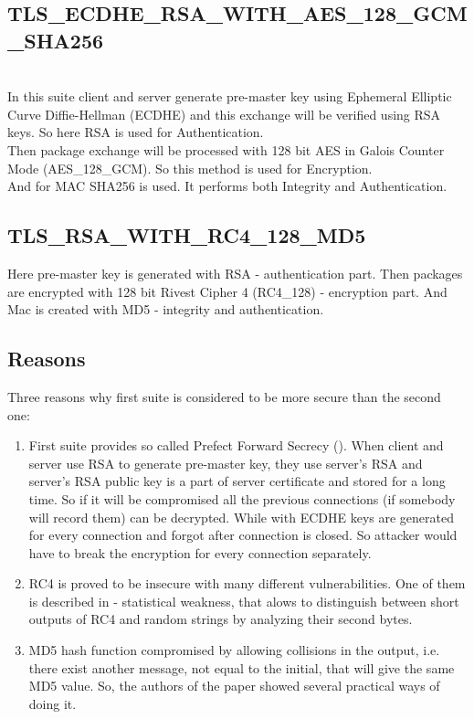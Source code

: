 \documentclass{article}
\begin{document}
\subsection*{TLS\_ECDHE\_RSA\_WITH\_AES\_128\_GCM\_SHA256}
\cite{tls-ref}
\\
In this suite client and server generate pre-master key using Ephemeral Elliptic Curve Diffie-Hellman (ECDHE) and this exchange will be verified using RSA keys. So here RSA is used for Authentication. 
\\
Then package exchange will be processed with 128 bit AES in Galois Counter Mode (AES\_128\_GCM). So this method is used for Encryption.
\\
And for MAC SHA256 is used. It performs both Integrity and Authentication.

\subsection*{TLS\_RSA\_WITH\_RC4\_128\_MD5}
Here pre-master key is generated with RSA - authentication part. Then packages are encrypted with 128 bit Rivest Cipher 4 (RC4\_128) - encryption part. And Mac is created with MD5 - integrity and authentication.

\subsection*{Reasons}
Three reasons why first suite is considered to be more secure than the second one:
\begin{enumerate}
\item First suite provides so called Prefect Forward Secrecy (\cite{pfc}). When client and server use RSA to generate pre-master key, they use server's RSA and server's RSA public key is a part of server certificate and stored for a long time. So if it will be compromised all the previous connections (if somebody will record them) can be decrypted. While with ECDHE keys are generated for every connection and forgot after connection is closed. So attacker would have to break the encryption for every connection separately.
\item RC4 is proved to be insecure with many different vulnerabilities. One of them is described in \cite{rc4-vuln} - statistical weakness, that alows to distinguish between short outputs of RC4 and random strings by analyzing their second bytes. 
\item MD5 hash function compromised by allowing collisions in the output, i.e. there exist another message, not equal to the initial, that will give the same MD5 value. So, the authors of the paper \cite{md5-coll} showed several practical ways of doing it.
\end{enumerate}
\end{document}
